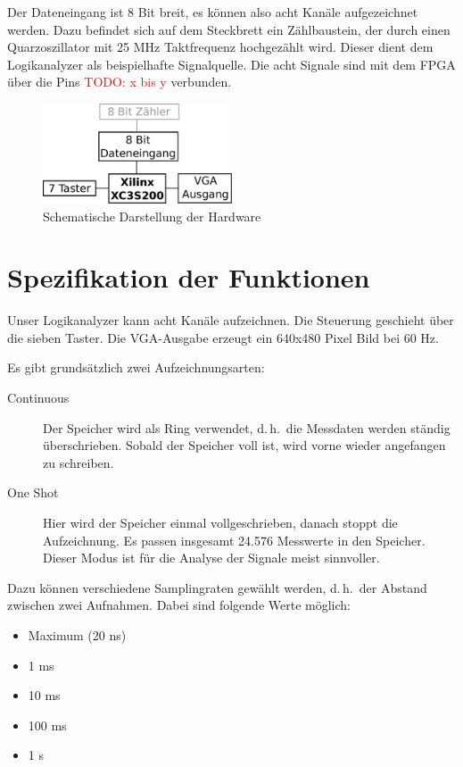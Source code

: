 \documentclass[IN,ngerman,utf8,12pt]{tumbook}
\newcommand\todo[1]{\textcolor{red}{TODO: #1}}
\newcommand{\dah}{d.\,h.\ }
\begin{document}
Der Dateneingang ist 8 Bit breit, es können also acht Kanäle aufgezeichnet werden.
Dazu befindet sich auf dem Steckbrett ein Zählbaustein, der durch einen Quarzoszillator mit 25 MHz Taktfrequenz hochgezählt wird.
Dieser dient dem Logikanalyzer als beispielhafte Signalquelle.
Die acht Signale sind mit dem FPGA über die Pins \todo{x bis y} verbunden.

\begin{figure}
    \centerline{
        \includegraphics[width=0.5\textwidth]{img/hardware}
    }
    \caption{Schematische Darstellung der Hardware}
\end{figure}

\chapter{Spezifikation der Funktionen}

Unser Logikanalyzer kann acht Kanäle aufzeichnen.
Die Steuerung geschieht über die sieben Taster.
Die VGA-Ausgabe erzeugt ein 640x480 Pixel Bild bei 60 Hz.

Es gibt grundsätzlich zwei Aufzeichnungsarten:

\begin{description}
    \item[Continuous] Der Speicher wird als Ring verwendet, \dah die Messdaten werden ständig überschrieben.
        Sobald der Speicher voll ist, wird vorne wieder angefangen zu schreiben.
    \item[One Shot] Hier wird der Speicher einmal vollgeschrieben, danach stoppt die Aufzeichnung.
        Es passen insgesamt 24.576 Messwerte in den Speicher.
        Dieser Modus ist für die Analyse der Signale meist sinnvoller.
\end{description}

Dazu können verschiedene Samplingraten gewählt werden, \dah der Abstand zwischen zwei Aufnahmen.
Dabei sind folgende Werte möglich:

\begin{itemize}
    \item Maximum (20 ns)
    \item 1 ms
    \item 10 ms
    \item 100 ms
    \item 1 s
\end{itemize}
\end{document}
